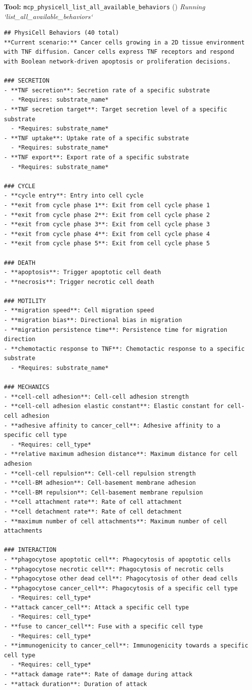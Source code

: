 \documentclass[11pt,a4paper]{article}
\begin{document}
\begin{toolokbox}
\textbf{Tool:} \texttt{mcp\_physicell\_list\_all\_available\_behaviors} (\checkmark)
\textit{Running `list\_all\_available\_behaviors`}
\begin{lstlisting}
## PhysiCell Behaviors (40 total)
**Current scenario:** Cancer cells growing in a 2D tissue environment with TNF diffusion. Cancer cells express TNF receptors and respond with Boolean network-driven apoptosis or proliferation decisions.

### SECRETION
- **TNF secretion**: Secretion rate of a specific substrate
  - *Requires: substrate_name*
- **TNF secretion target**: Target secretion level of a specific substrate
  - *Requires: substrate_name*
- **TNF uptake**: Uptake rate of a specific substrate
  - *Requires: substrate_name*
- **TNF export**: Export rate of a specific substrate
  - *Requires: substrate_name*

### CYCLE
- **cycle entry**: Entry into cell cycle
- **exit from cycle phase 1**: Exit from cell cycle phase 1
- **exit from cycle phase 2**: Exit from cell cycle phase 2
- **exit from cycle phase 3**: Exit from cell cycle phase 3
- **exit from cycle phase 4**: Exit from cell cycle phase 4
- **exit from cycle phase 5**: Exit from cell cycle phase 5

### DEATH
- **apoptosis**: Trigger apoptotic cell death
- **necrosis**: Trigger necrotic cell death

### MOTILITY
- **migration speed**: Cell migration speed
- **migration bias**: Directional bias in migration
- **migration persistence time**: Persistence time for migration direction
- **chemotactic response to TNF**: Chemotactic response to a specific substrate
  - *Requires: substrate_name*

### MECHANICS
- **cell-cell adhesion**: Cell-cell adhesion strength
- **cell-cell adhesion elastic constant**: Elastic constant for cell-cell adhesion
- **adhesive affinity to cancer_cell**: Adhesive affinity to a specific cell type
  - *Requires: cell_type*
- **relative maximum adhesion distance**: Maximum distance for cell adhesion
- **cell-cell repulsion**: Cell-cell repulsion strength
- **cell-BM adhesion**: Cell-basement membrane adhesion
- **cell-BM repulsion**: Cell-basement membrane repulsion
- **cell attachment rate**: Rate of cell attachment
- **cell detachment rate**: Rate of cell detachment
- **maximum number of cell attachments**: Maximum number of cell attachments

### INTERACTION
- **phagocytose apoptotic cell**: Phagocytosis of apoptotic cells
- **phagocytose necrotic cell**: Phagocytosis of necrotic cells
- **phagocytose other dead cell**: Phagocytosis of other dead cells
- **phagocytose cancer_cell**: Phagocytosis of a specific cell type
  - *Requires: cell_type*
- **attack cancer_cell**: Attack a specific cell type
  - *Requires: cell_type*
- **fuse to cancer_cell**: Fuse with a specific cell type
  - *Requires: cell_type*
- **immunogenicity to cancer_cell**: Immunogenicity towards a specific cell type
  - *Requires: cell_type*
- **attack damage rate**: Rate of damage during attack
- **attack duration**: Duration of attack


\end{lstlisting}
\end{toolokbox}
\end{document}
